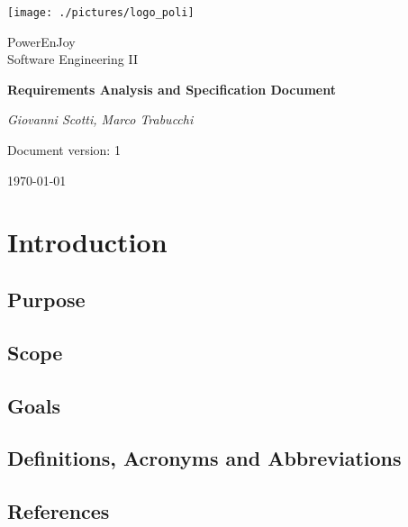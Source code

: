 \documentclass[a4paper,12pt]{report}
\begin{document}
\begin{titlepage}
\centering
\texttt{[image: ./pictures/logo\_poli]}\par
	\vspace{1.5cm}
	{\Large {PowerEnJoy \\ 
		Software Engineering II} \par}
	\vspace{1.5cm}
	{\LARGE \textbf{Requirements Analysis and Specification Document} \par}
	\vspace{1.5cm}
	{\Large\itshape Giovanni Scotti, Marco Trabucchi\par}
	\vspace{2cm}
	\vfill
	{\large Document version: 1\par}
	{\large \today \par}
\end{titlepage}

\tableofcontents

\chapter{Introduction}
\label{ch:Introduction}

\section{Purpose}


\section{Scope}


\section{Goals}


\section{Definitions, Acronyms and Abbreviations}


\section{References}

\end{document}
